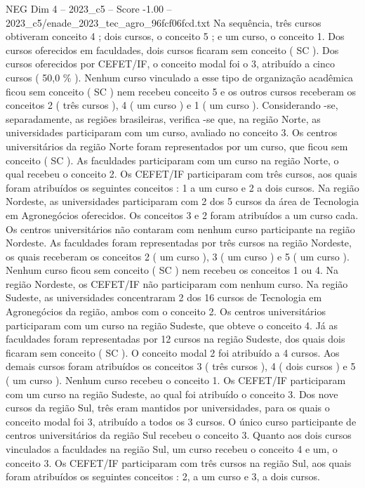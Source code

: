 \begin{textsample}{NEG Dim 4 – 2023\_c5 – Score -1.00 – 2023\_c5/enade\_2023\_tec\_agro\_96fcf06fcd.txt}
Na sequência, três cursos obtiveram conceito 4 ; dois cursos, o conceito 5 ; e um curso, o conceito 1.
Dos cursos oferecidos em faculdades, dois cursos ficaram sem conceito ( SC ).
Dos cursos oferecidos por CEFET/IF, o conceito modal foi o 3, atribuído a cinco cursos ( 50,0 \% ).
Nenhum curso vinculado a esse tipo de organização acadêmica ficou sem conceito ( SC ) nem recebeu conceito 5 e os outros cursos receberam os conceitos 2 ( três cursos ), 4 ( um curso ) e 1 ( um curso ).
Considerando -se, separadamente, as regiões brasileiras, verifica -se que, na região Norte, as universidades participaram com um curso, avaliado no conceito 3.
Os centros universitários da região Norte foram representados por um curso, que ficou sem conceito ( SC ).
As faculdades participaram com um curso na região Norte, o qual recebeu o conceito 2.
Os CEFET/IF participaram com três cursos, aos quais foram atribuídos os seguintes conceitos : 1 a um curso e 2 a dois cursos.
Na região Nordeste, as universidades participaram com 2 dos 5 cursos da área de Tecnologia em Agronegócios oferecidos.
Os conceitos 3 e 2 foram atribuídos a um curso cada.
Os centros universitários não contaram com nenhum curso participante na região Nordeste.
As faculdades foram representadas por três cursos na região Nordeste, os quais receberam os conceitos 2 ( um curso ), 3 ( um curso ) e 5 ( um curso ).
Nenhum curso ficou sem conceito ( SC ) nem recebeu os conceitos 1 ou 4.
Na região Nordeste, os CEFET/IF não participaram com nenhum curso.
Na região Sudeste, as universidades concentraram 2 dos 16 cursos de Tecnologia em Agronegócios da região, ambos com o conceito 2.
Os centros universitários participaram com um curso na região Sudeste, que obteve o conceito 4.
Já as faculdades foram representadas por 12 cursos na região Sudeste, dos quais dois ficaram sem conceito ( SC ).
O conceito modal 2 foi atribuído a 4 cursos.
Aos demais cursos foram atribuídos os conceitos 3 ( três cursos ), 4 ( dois cursos ) e 5 ( um curso ).
Nenhum curso recebeu o conceito 1.
Os CEFET/IF participaram com um curso na região Sudeste, ao qual foi atribuído o conceito 3.
Dos nove cursos da região Sul, três eram mantidos por universidades, para os quais o conceito modal foi 3, atribuído a todos os 3 cursos.
O único curso participante de centros universitários da região Sul recebeu o conceito 3.
Quanto aos dois cursos vinculados a faculdades na região Sul, um curso recebeu o conceito 4 e um, o conceito 3.
Os CEFET/IF participaram com três cursos na região Sul, aos quais foram atribuídos os seguintes conceitos : 2, a um curso e 3, a dois cursos.

\end{textsample}
